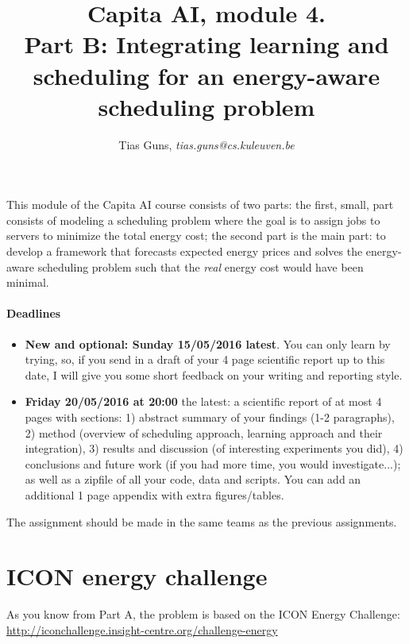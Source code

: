 \documentclass[a4,10pt]{article}
\title{Capita AI, module 4.\\Part B: Integrating learning and scheduling for an energy-aware scheduling problem}
\author{Tias Guns, \textit{tias.guns@cs.kuleuven.be}}
\begin{document}
\maketitle

This module of the Capita AI course consists of two parts: the first, small, part consists of modeling a scheduling problem where the goal is to assign jobs to servers to minimize the total energy cost; the second part is the main part: to develop a framework that forecasts expected energy prices and solves the energy-aware scheduling problem such that the \textit{real} energy cost would have been minimal.

\paragraph{Deadlines}
\begin{itemize}
\item \textbf{New and optional: Sunday 15/05/2016 latest}. You can only learn by trying, so, if you send in a draft of your 4 page scientific report up to this date, I will give you some short feedback on your writing and reporting style.
\item \textbf{Friday 20/05/2016 at 20:00} the latest: a scientific report of at most 4 pages with sections: 1) abstract summary of your findings (1-2 paragraphs), 2) method (overview of scheduling approach, learning approach and their integration), 3) results and discussion (of interesting experiments you did), 4) conclusions and future work (if you had more time, you would investigate...); as well as a zipfile of all your code, data and scripts. You can add an additional 1 page appendix with extra figures/tables.
\end{itemize}

The assignment should be made in the same teams as the previous assignments.


\section{ICON energy challenge}
As you know from Part A, the problem is based on the ICON Energy Challenge:\\
\url{http://iconchallenge.insight-centre.org/challenge-energy}
\end{document}
